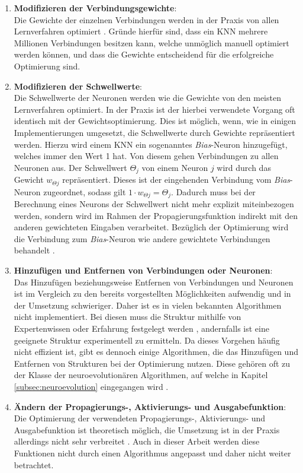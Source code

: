 \begin{enumerate}
	\item \textbf{Modifizieren der Verbindungsgewichte}:\\
	Die Gewichte der einzelnen Verbindungen werden in der Praxis von allen Lernverfahren optimiert \cite{zell2003simulation}. Gründe hierfür sind, dass ein \ac{KNN} mehrere Millionen Verbindungen besitzen kann, welche unmöglich manuell optimiert werden können, und dass die Gewichte entscheidend für die erfolgreiche Optimierung sind.

	\item\textbf{Modifizieren der Schwellwerte}:\\
	Die Schwellwerte der Neuronen werden wie die Gewichte von den meisten Lernverfahren optimiert. In der Praxis ist der hierbei verwendete Vorgang oft identisch mit der Gewichtsoptimierung. Dies ist möglich, wenn, wie in einigen Implementierungen umgesetzt, die Schwellwerte durch Gewichte repräsentiert werden. Hierzu wird einem \ac{KNN} ein sogenanntes \emph{Bias}-Neuron hinzugefügt, welches immer den Wert 1 hat. Von diesem gehen Verbindungen zu allen Neuronen aus. Der Schwellwert $\Theta_j$ von einem Neuron $j$ wird durch das Gewicht $w_{\Theta j}$ repräsentiert. Dieses ist der eingehenden Verbindung vom \emph{Bias}-Neuron zugeordnet, sodass gilt $1\cdot w_{\Theta j} = \Theta_j$. Dadurch muss bei der Berechnung eines Neurons der Schwellwert nicht mehr explizit miteinbezogen werden, sondern wird im Rahmen der Propagierungsfunktion indirekt mit den anderen gewichteten Eingaben verarbeitet. Bezüglich der Optimierung wird die Verbindung zum \emph{Bias}-Neuron wie andere gewichtete Verbindungen behandelt \cite{zell2003simulation}.

	\item \textbf{Hinzufügen und Entfernen von Verbindungen oder Neuronen}:\\
	Das Hinzufügen beziehungsweise Entfernen von Verbindungen und Neuronen ist im Vergleich zu den bereits vorgestellten Möglichkeiten aufwendig und in der Umsetzung schwieriger. Daher ist es in vielen bekannten Algorithmen nicht implementiert. Bei diesen muss die Struktur mithilfe von Expertenwissen oder Erfahrung festgelegt werden \cite{stanley2017oreilly}, andernfalls ist eine geeignete Struktur experimentell zu ermitteln. Da dieses Vorgehen häufig nicht effizient ist, gibt es dennoch einige Algorithmen, die das Hinzufügen und Entfernen von Strukturen bei der Optimierung nutzen. Diese gehören oft zu der Klasse der neuroevolutionären Algorithmen, auf welche in Kapitel \ref{subsec:neuroevolution} eingegangen wird \cite{kriesel2008kleiner}.
	
	\item \textbf{Ändern der Propagierungs-, Aktivierungs- und Ausgabefunktion}:\\
	Die Optimierung der verwendeten Propagierungs-, Aktivierungs- und Ausgabefunktion ist theoretisch möglich, die Umsetzung ist in der Praxis allerdings nicht sehr verbreitet \cite{zell2003simulation}. Auch in dieser Arbeit werden diese Funktionen nicht durch einen Algorithmus angepasst und daher nicht weiter betrachtet. 
\end{enumerate}

